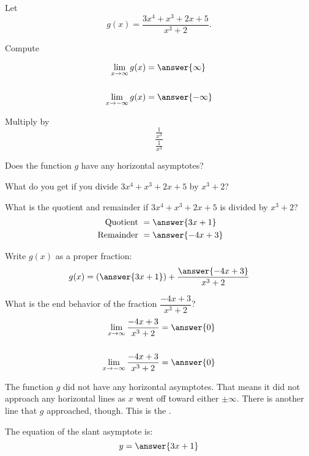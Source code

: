 \documentclass{ximera}
\author{Bobby Ramsey}
\begin{document}
\begin{exercise}
	Let \[ g(x) = \frac{3x^4+x^3+2x+5}{x^3+2}. \]
	
	Compute

	\begin{align*}
		\lim_{x\to \infty} g(x) &= \answer{\infty}\\ \\
		\lim_{x\to -\infty}g(x) &= \answer{-\infty}
	\end{align*}

	\begin{hint}
		Multiply by \[\frac{\frac{1}{x^3}}{\frac{1}{x^3}}\]
	\end{hint}

	\begin{exercise}
		Does the function $g$ have any horizontal asymptotes?
		\begin{multipleChoice}
		\end{multipleChoice}
		\begin{hint}
			What do you get if you divide $3x^4+x^3+2x+5$ by $x^3+2$?
		\end{hint}
		
		\begin{exercise}
			What is the quotient and remainder if $3x^4+x^3+2x+5$ is divided by $x^3+2$?
			\begin{align*}
				\text{ Quotient } &= \answer{3x+1}\\
				\text{ Remainder } &= \answer{-4x+3}	
			\end{align*}
			\begin{exercise}
				Write $g(x)$ as a proper fraction:
				\[ g(x) = \left( \answer{3x+1} \right) + \frac{\answer{-4x+3}}{x^3+2} \]
				\begin{exercise}
					What is the end behavior of the fraction $\dfrac{-4x+3}{x^3+2}$?
					\begin{align*}
						\lim_{x\to \infty} \frac{-4x+3}{x^3+2} &= \answer{0} \\ \\
						\lim_{x\to -\infty} \frac{-4x+3}{x^3+2} &= \answer{0} \\
					\end{align*}
					\begin{exercise}
						The function $g$ did not have any horizontal asymptotes.  That means it did not approach any horizontal lines as $x$ went off toward either $\pm \infty$.
						There is another line that $g$ approached, though.  This is the .
						\begin{exercise}	
							The equation of the slant asymptote is:
							\[ y = \answer{3x+1} \]
						\end{exercise}
					\end{exercise}
				\end{exercise}
			\end{exercise}
		\end{exercise}
	\end{exercise}
\end{exercise}
\end{document}
